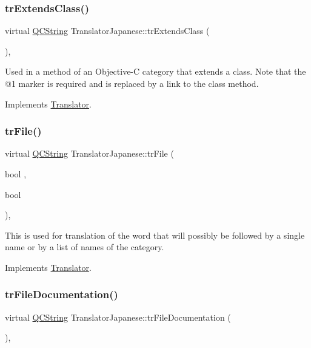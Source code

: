 \subsubsection{\texorpdfstring{trExtendsClass()}{trExtendsClass()}}
{\footnotesize\ttfamily virtual \mbox{\hyperlink{class_q_c_string}{Q\+C\+String}} Translator\+Japanese\+::tr\+Extends\+Class (\begin{DoxyParamCaption}{ }\end{DoxyParamCaption})\hspace{0.3cm}{\ttfamily [inline]}, {\ttfamily [virtual]}}

Used in a method of an Objective-\/C category that extends a class. Note that the @1 marker is required and is replaced by a link to the class method. 

Implements \mbox{\hyperlink{class_translator}{Translator}}.

\mbox{\label{class_translator_japanese_ac66c7700778f3d1409d2670c9123e55e}} 
\subsubsection{\texorpdfstring{trFile()}{trFile()}}
{\footnotesize\ttfamily virtual \mbox{\hyperlink{class_q_c_string}{Q\+C\+String}} Translator\+Japanese\+::tr\+File (\begin{DoxyParamCaption}\item[{bool}]{,  }\item[{bool}]{ }\end{DoxyParamCaption})\hspace{0.3cm}{\ttfamily [inline]}, {\ttfamily [virtual]}}

This is used for translation of the word that will possibly be followed by a single name or by a list of names of the category. 

Implements \mbox{\hyperlink{class_translator}{Translator}}.

\mbox{\label{class_translator_japanese_aaae4a8fe9bc640dba47fc68934e5d04e}} 
\subsubsection{\texorpdfstring{trFileDocumentation()}{trFileDocumentation()}}
{\footnotesize\ttfamily virtual \mbox{\hyperlink{class_q_c_string}{Q\+C\+String}} Translator\+Japanese\+::tr\+File\+Documentation (\begin{DoxyParamCaption}{ }\end{DoxyParamCaption})\hspace{0.3cm}{\ttfamily [inline]}, {\ttfamily [virtual]}}

